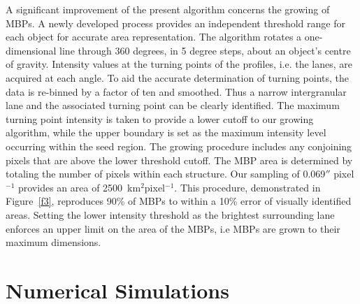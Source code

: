 \documentclass{emulateapj}
\begin{document}
A significant improvement of the present algorithm concerns the growing of MBPs. A newly developed process provides an independent threshold range for each object for accurate area representation.  The algorithm rotates a one-dimensional line through 360 degrees, in 5 degree steps, about an object's centre of gravity.  Intensity values at the turning points of the profiles, i.e. the lanes, are acquired at each angle.  To aid the accurate determination of turning points, the data is re-binned by a factor of ten  and smoothed.  Thus a narrow intergranular lane and the associated turning point can be clearly identified.  The maximum turning point intensity is taken to provide a lower cutoff to our growing algorithm, while the upper boundary is set as the maximum intensity level occurring within the seed region.    The growing procedure includes any conjoining pixels that are above the lower threshold cutoff. The MBP area is determined by totaling the number of pixels within each structure. Our sampling of 0.069$''$ pixel$^{-1}$ provides an area of 2500~km$^2$pixel$^{-1}$.  
This procedure, demonstrated in Figure~\ref{f3}, reproduces 90\% of MBPs to within a 10\% error of visually identified areas.  Setting the lower intensity threshold as the brightest surrounding lane enforces an upper limit on the area of the MBPs, i.e MBPs are grown to their maximum dimensions.


\section{Numerical Simulations}
\label{simulations}
\end{document}
